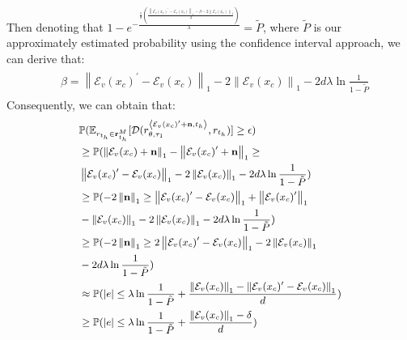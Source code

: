 Then denoting that $1 - e^{-\frac{\frac{1}{d}(\frac{\left\|\mathcal{E}_v(x_c)^{\prime}-\mathcal{E}_v(x_c)\right\|_1-\beta-2\left\|\mathcal{E}_v(x_c)\right\|_1}{2})}{\lambda}}=\tilde{P}$, where $\tilde{P}$ is our approximately estimated probability using the confidence interval approach, we can derive that:
\begin{align}
\begin{split}
&\beta = \left\|\mathcal{E}_v(x_c)^{\prime}-\mathcal{E}_v(x_c)\right\|_1-2\left\|\mathcal{E}_v(x_c)\right\|_1-2d\lambda\ln\frac{1}{1-\tilde{P}}
\end{split}
\end{align}
Consequently, we can obtain that:
\begin{align}
\small
\begin{split}
&\mathbb{P}(\mathbb{E}_{r_{t_h}\in\mathbf{r}_{t_h}^M}[\mathcal{D}(r_{\theta, \tau_1}^{\left<\mathcal{E}_v(x_c)^{\prime}+\mathbf{n}, t_h\right>}, r_{t_h})]\geq\epsilon)\\
&\geq\mathbb{P}(\left\|\mathcal{E}_v(x_c)+\mathbf{n}\right\|_1-\left\|\mathcal{E}_v(x_c)^{\prime}+\mathbf{n}\right\|_1\geq\\
&\left\|\mathcal{E}_v(x_c)^{\prime}-\mathcal{E}_v(x_c)\right\|_1-2\left\|\mathcal{E}_v(x_c)\right\|_1-2d\lambda\ln\frac{1}{1-\tilde{P}})\\
&\geq\mathbb{P}(-2\left\|\mathbf{n}\right\|_1\geq\left\|\mathcal{E}_v(x_c)^{\prime}-\mathcal{E}_v(x_c)\right\|_1+\left\|\mathcal{E}_v(x_c)^{\prime}\right\|_1\\
&-\left\|\mathcal{E}_v(x_c)\right\|_1-2\left\|\mathcal{E}_v(x_c)\right\|_1-2d\lambda\ln\frac{1}{1-\tilde{P}})\\
&\geq\mathbb{P}(-2\left\|\mathbf{n}\right\|_1\geq2\left\|\mathcal{E}_v(x_c)^{\prime}-\mathcal{E}_v(x_c)\right\|_1-2\left\|\mathcal{E}_v(x_c)\right\|_1\\
&-2d\lambda\ln\frac{1}{1-\tilde{P}})\\
&\approx\mathbb{P}(|e|\leq\lambda\ln\frac{1}{1-\tilde{P}}+\frac{\left\|\mathcal{E}_v(x_c)\right\|_1-\left\|\mathcal{E}_v(x_c)^{\prime}-\mathcal{E}_v(x_c)\right\|_1}{d})\\
&\geq\mathbb{P}(|e|\leq\lambda\ln\frac{1}{1-\tilde{P}}+\frac{\left\|\mathcal{E}_v(x_c)\right\|_1-\delta}{d})\\
\end{split}
\end{align}
